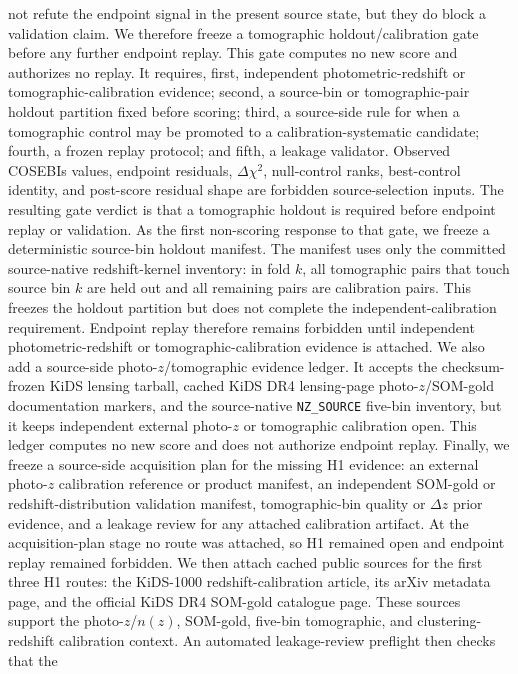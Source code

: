 \documentclass[11pt]{article}
\begin{document}
not refute the endpoint signal in the present source state, but they do block a
validation claim.
We therefore freeze a tomographic holdout/calibration gate before any further
endpoint replay. This gate computes no new score and authorizes no replay. It
requires, first, independent photometric-redshift or tomographic-calibration
evidence; second, a source-bin or tomographic-pair holdout partition fixed
before scoring; third, a source-side rule for when a tomographic control may be
promoted to a calibration-systematic candidate; fourth, a frozen replay
protocol; and fifth, a leakage validator. Observed COSEBIs values, endpoint
residuals, \(\Delta\chi^2\), null-control ranks, best-control identity, and
post-score residual shape are forbidden source-selection inputs. The resulting
gate verdict is that a tomographic holdout is required before endpoint replay
or validation.
As the first non-scoring response to that gate, we freeze a deterministic
source-bin holdout manifest. The manifest uses only the committed
source-native redshift-kernel inventory: in fold \(k\), all tomographic pairs
that touch source bin \(k\) are held out and all remaining pairs are
calibration pairs. This freezes the holdout partition but does not complete the
independent-calibration requirement. Endpoint replay therefore remains
forbidden until independent photometric-redshift or tomographic-calibration
evidence is attached.
We also add a source-side photo-\(z\)/tomographic evidence ledger. It accepts
the checksum-frozen KiDS lensing tarball, cached KiDS DR4 lensing-page
photo-\(z\)/SOM-gold documentation markers, and the source-native
\texttt{NZ\_\allowbreak{}SOURCE} five-bin inventory, but it keeps independent external
photo-\(z\) or tomographic calibration open. This ledger computes no new score
and does not authorize endpoint replay.
Finally, we freeze a source-side acquisition plan for the missing H1 evidence:
an external photo-\(z\) calibration reference or product manifest, an
independent SOM-gold or redshift-distribution validation manifest,
tomographic-bin quality or \(\Delta z\) prior evidence, and a leakage review
for any attached calibration artifact. At the acquisition-plan stage no route
was attached, so H1 remained open and endpoint replay remained forbidden.
We then attach cached public sources for the first three H1 routes: the
KiDS-1000 redshift-calibration article, its arXiv metadata page, and the
official KiDS DR4 SOM-gold catalogue page. These sources support the
photo-\(z\)/\(n(z)\), SOM-gold, five-bin tomographic, and clustering-redshift
calibration context. An automated leakage-review preflight then checks that the
\end{document}
